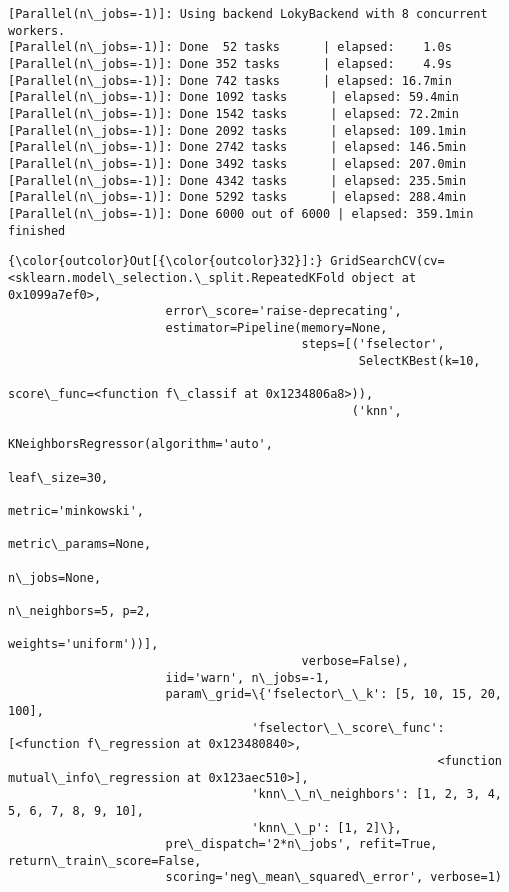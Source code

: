 \documentclass[11pt]{article}
\begin{document}
    \begin{Verbatim}[commandchars=\\\{\}]
[Parallel(n\_jobs=-1)]: Using backend LokyBackend with 8 concurrent workers.
[Parallel(n\_jobs=-1)]: Done  52 tasks      | elapsed:    1.0s
[Parallel(n\_jobs=-1)]: Done 352 tasks      | elapsed:    4.9s
[Parallel(n\_jobs=-1)]: Done 742 tasks      | elapsed: 16.7min
[Parallel(n\_jobs=-1)]: Done 1092 tasks      | elapsed: 59.4min
[Parallel(n\_jobs=-1)]: Done 1542 tasks      | elapsed: 72.2min
[Parallel(n\_jobs=-1)]: Done 2092 tasks      | elapsed: 109.1min
[Parallel(n\_jobs=-1)]: Done 2742 tasks      | elapsed: 146.5min
[Parallel(n\_jobs=-1)]: Done 3492 tasks      | elapsed: 207.0min
[Parallel(n\_jobs=-1)]: Done 4342 tasks      | elapsed: 235.5min
[Parallel(n\_jobs=-1)]: Done 5292 tasks      | elapsed: 288.4min
[Parallel(n\_jobs=-1)]: Done 6000 out of 6000 | elapsed: 359.1min finished

    \end{Verbatim}

\begin{Verbatim}[commandchars=\\\{\}]
{\color{outcolor}Out[{\color{outcolor}32}]:} GridSearchCV(cv=<sklearn.model\_selection.\_split.RepeatedKFold object at 0x1099a7ef0>,
                      error\_score='raise-deprecating',
                      estimator=Pipeline(memory=None,
                                         steps=[('fselector',
                                                 SelectKBest(k=10,
                                                             score\_func=<function f\_classif at 0x1234806a8>)),
                                                ('knn',
                                                 KNeighborsRegressor(algorithm='auto',
                                                                     leaf\_size=30,
                                                                     metric='minkowski',
                                                                     metric\_params=None,
                                                                     n\_jobs=None,
                                                                     n\_neighbors=5, p=2,
                                                                     weights='uniform'))],
                                         verbose=False),
                      iid='warn', n\_jobs=-1,
                      param\_grid=\{'fselector\_\_k': [5, 10, 15, 20, 100],
                                  'fselector\_\_score\_func': [<function f\_regression at 0x123480840>,
                                                            <function mutual\_info\_regression at 0x123aec510>],
                                  'knn\_\_n\_neighbors': [1, 2, 3, 4, 5, 6, 7, 8, 9, 10],
                                  'knn\_\_p': [1, 2]\},
                      pre\_dispatch='2*n\_jobs', refit=True, return\_train\_score=False,
                      scoring='neg\_mean\_squared\_error', verbose=1)
\end{Verbatim}
            
\end{document}

